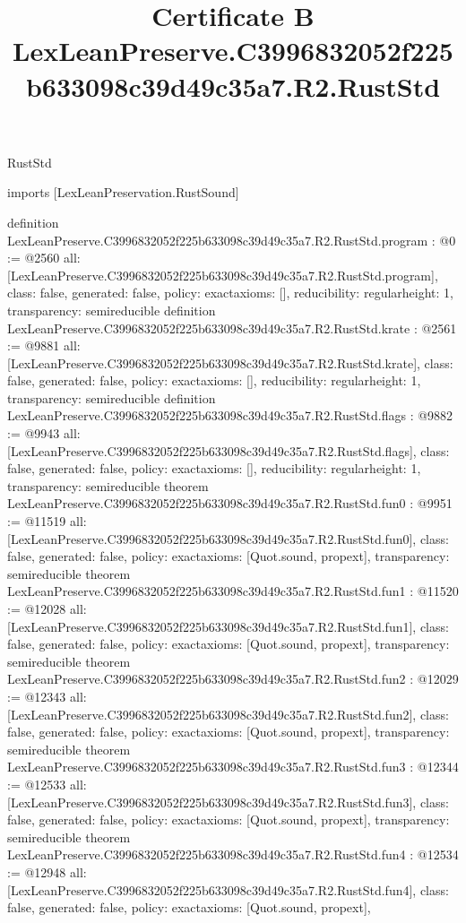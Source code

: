 \begin{lexlean}{RustStd}
\title{Certificate B LexLeanPreserve.C3996832052f225b633098c39d49c35a7.R2.RustStd}
\begin{coremodule}
imports [LexLeanPreservation.RustSound]

definition LexLeanPreserve.C3996832052f225b633098c39d49c35a7.R2.RustStd.program : @0 := @2560 {
  all: [LexLeanPreserve.C3996832052f225b633098c39d49c35a7.R2.RustStd.program],
  class: false,
  generated: false,
  policy: exact{axioms: []},
  reducibility: regular{height: 1},
  transparency: semireducible
}
definition LexLeanPreserve.C3996832052f225b633098c39d49c35a7.R2.RustStd.krate : @2561 := @9881 {
  all: [LexLeanPreserve.C3996832052f225b633098c39d49c35a7.R2.RustStd.krate],
  class: false,
  generated: false,
  policy: exact{axioms: []},
  reducibility: regular{height: 1},
  transparency: semireducible
}
definition LexLeanPreserve.C3996832052f225b633098c39d49c35a7.R2.RustStd.flags : @9882 := @9943 {
  all: [LexLeanPreserve.C3996832052f225b633098c39d49c35a7.R2.RustStd.flags],
  class: false,
  generated: false,
  policy: exact{axioms: []},
  reducibility: regular{height: 1},
  transparency: semireducible
}
theorem LexLeanPreserve.C3996832052f225b633098c39d49c35a7.R2.RustStd.fun0 : @9951 := @11519 {
  all: [LexLeanPreserve.C3996832052f225b633098c39d49c35a7.R2.RustStd.fun0],
  class: false,
  generated: false,
  policy: exact{axioms: [Quot.sound, propext]},
  transparency: semireducible
}
theorem LexLeanPreserve.C3996832052f225b633098c39d49c35a7.R2.RustStd.fun1 : @11520 := @12028 {
  all: [LexLeanPreserve.C3996832052f225b633098c39d49c35a7.R2.RustStd.fun1],
  class: false,
  generated: false,
  policy: exact{axioms: [Quot.sound, propext]},
  transparency: semireducible
}
theorem LexLeanPreserve.C3996832052f225b633098c39d49c35a7.R2.RustStd.fun2 : @12029 := @12343 {
  all: [LexLeanPreserve.C3996832052f225b633098c39d49c35a7.R2.RustStd.fun2],
  class: false,
  generated: false,
  policy: exact{axioms: [Quot.sound, propext]},
  transparency: semireducible
}
theorem LexLeanPreserve.C3996832052f225b633098c39d49c35a7.R2.RustStd.fun3 : @12344 := @12533 {
  all: [LexLeanPreserve.C3996832052f225b633098c39d49c35a7.R2.RustStd.fun3],
  class: false,
  generated: false,
  policy: exact{axioms: [Quot.sound, propext]},
  transparency: semireducible
}
theorem LexLeanPreserve.C3996832052f225b633098c39d49c35a7.R2.RustStd.fun4 : @12534 := @12948 {
  all: [LexLeanPreserve.C3996832052f225b633098c39d49c35a7.R2.RustStd.fun4],
  class: false,
  generated: false,
  policy: exact{axioms: [Quot.sound, propext]},
}
\end{coremodule}
\end{lexlean}
